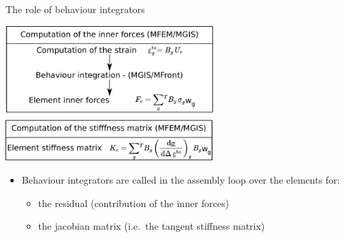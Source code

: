 \documentclass{beamer}
\begin{document}
%
\begin{frame}{The role of behaviour integrators}
  \begin{center}
    \includegraphics[width=0.6\textwidth]{img/behaviour-integrators.pdf}
  \end{center}
  \begin{itemize}
    \item Behaviour integrators are called in the assembly loop
    over the elements for:
    \begin{itemize}
      \item the residual (contribution of the inner forces) 
      \item the jacobian matrix (i.e.~the tangent stiffness matrix)
    \end{itemize}
  \end{itemize}
\end{frame}
\end{document}

